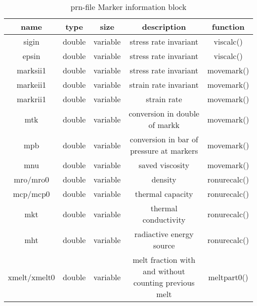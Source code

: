 \begin{table}[H]
\small
\centering
\begin{tabular}{c c c c c}
\toprule
name & type & size & description & function \\  
\midrule
sigin & double & variable & stress rate invariant & viscalc() \\

epsin & double & variable & stress rate invariant & viscalc() \\
 
marksii1 & double & variable & stress rate invariant & movemark() \\ 

markeii1 & double & variable & strain rate invariant & movemark() \\ 

markrii1 & double & variable & strain rate & movemark() \\ 

mtk & double & variable & conversion in double of markk & movemark() \\ 

mpb & double & variable & conversion in bar of pressure at markers & movemark() \\ 

mnu & double & variable & saved viscosity & movemark() \\ 

mro/mro0 & double & variable & density & ronurecalc() \\

mcp/mcp0 & double & variable & thermal capacity & ronurecalc() \\

mkt & double & variable & thermal conductivity & ronurecalc() \\

mht & double & variable & radiactive energy source & ronurecalc() \\

xmelt/xmelt0 & double & variable & melt fraction with and without counting previous melt & meltpart0() \\
\bottomrule
\end{tabular}
\caption{prn-file Marker information block}
\label{tbl:prn_marker_info}
\end{table}